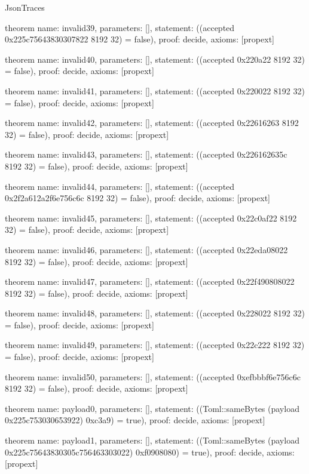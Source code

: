 \begin{lexlean}{JsonTraces}
\begin{semanticmodule}
theorem{
  name: invalid39,
  parameters: [],
  statement: ((accepted 0x225c75643830307822 8192 32) = false),
  proof: decide{},
  axioms: [propext]
}

theorem{
  name: invalid40,
  parameters: [],
  statement: ((accepted 0x220a22 8192 32) = false),
  proof: decide{},
  axioms: [propext]
}

theorem{
  name: invalid41,
  parameters: [],
  statement: ((accepted 0x220022 8192 32) = false),
  proof: decide{},
  axioms: [propext]
}

theorem{
  name: invalid42,
  parameters: [],
  statement: ((accepted 0x22616263 8192 32) = false),
  proof: decide{},
  axioms: [propext]
}

theorem{
  name: invalid43,
  parameters: [],
  statement: ((accepted 0x226162635c 8192 32) = false),
  proof: decide{},
  axioms: [propext]
}

theorem{
  name: invalid44,
  parameters: [],
  statement: ((accepted 0x2f2a612a2f6e756c6c 8192 32) = false),
  proof: decide{},
  axioms: [propext]
}

theorem{
  name: invalid45,
  parameters: [],
  statement: ((accepted 0x22c0af22 8192 32) = false),
  proof: decide{},
  axioms: [propext]
}

theorem{
  name: invalid46,
  parameters: [],
  statement: ((accepted 0x22eda08022 8192 32) = false),
  proof: decide{},
  axioms: [propext]
}

theorem{
  name: invalid47,
  parameters: [],
  statement: ((accepted 0x22f490808022 8192 32) = false),
  proof: decide{},
  axioms: [propext]
}

theorem{
  name: invalid48,
  parameters: [],
  statement: ((accepted 0x228022 8192 32) = false),
  proof: decide{},
  axioms: [propext]
}

theorem{
  name: invalid49,
  parameters: [],
  statement: ((accepted 0x22c222 8192 32) = false),
  proof: decide{},
  axioms: [propext]
}

theorem{
  name: invalid50,
  parameters: [],
  statement: ((accepted 0xefbbbf6e756c6c 8192 32) = false),
  proof: decide{},
  axioms: [propext]
}

theorem{
  name: payload0,
  parameters: [],
  statement: ((Toml::sameBytes (payload 0x225c753030653922) 0xc3a9) = true),
  proof: decide{},
  axioms: [propext]
}

theorem{
  name: payload1,
  parameters: [],
  statement: ((Toml::sameBytes (payload 0x225c75643830305c756463303022) 0xf0908080) = true),
  proof: decide{},
  axioms: [propext]
}


\end{semanticmodule}
\end{lexlean}
